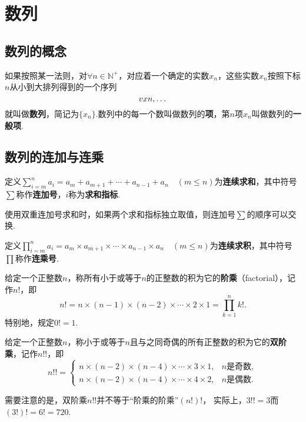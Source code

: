 \chapter{数列}
\section{数列的概念}
\begin{definition}
如果按照某一法则，对\(\forall n \in \mathbb{N}^+\)，对应着一个确定的实数\(x_n\)，这些实数\(x_n\)按照下标\(n\)从小到大排列得到的一个序列\[
v{x}{n},\dotsc
\]就叫做\textbf{数列}，简记为\(\{x_n\}\).数列中的每一个数叫做数列的\textbf{项}，第\(n\)项\(x_n\)叫做数列的\textbf{一般项}.
\end{definition}

\section{数列的连加与连乘}
\begin{definition}[连加]
定义\(\sum\limits_{i=m}^{n} {a_i} = a_m+a_{m+1}+\dotsb+a_{n-1}+a_n \quad (m \leqslant n)\)为\textbf{连续求和}，其中符号\(\sum\)称作\textbf{连加号}，\(i\)称为\textbf{求和指标}.
\end{definition}
使用双重连加号求和时，如果两个求和指标独立取值，则连加号\(\sum\)的顺序可以交换.

\begin{definition}[连乘]
定义\(\prod\limits_{i=m}^{n} {a_i} = a_m \times a_{m+1} \times \dotsb \times a_{n-1} \times a_n \quad (m \leqslant n)\)为\textbf{连续求积}，其中符号\(\prod\)称作\textbf{连乘号}.
\end{definition}

\begin{definition}
给定一个正整数\(n\)，称所有小于或等于\(n\)的正整数的积为它的\textbf{阶乘}（factorial），记作\(n!\)，即\begin{equation}
n! = n \times (n-1) \times (n-2) \times \dotsm \times 2 \times 1
= \prod\limits_{k=1}^n k!.
\end{equation}
特别地，规定\(0! = 1\).
\end{definition}

\begin{definition}
给定一个正整数\(n\)，称小于或等于\(n\)且与之同奇偶的所有正整数的积为它的\textbf{双阶乘}，记作\(n!!\)，即\begin{equation}
n!! = \begin{cases}
n \times (n-2) \times (n-4) \times \dotsm \times 3 \times 1, & n\text{是奇数}, \\
n \times (n-2) \times (n-4) \times \dotsm \times 4 \times 2, & n\text{是偶数}.
\end{cases}
\end{equation}
\end{definition}
需要注意的是，双阶乘\(n!!\)并不等于“阶乘的阶乘”\((n!)!\)，%
实际上，\(3!! = 3\)而\((3!)! = 6! = 720\).

